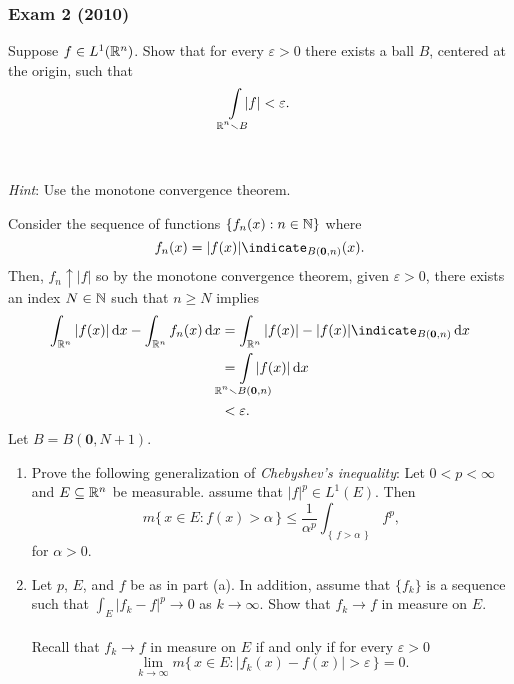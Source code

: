 \subsubsection{Exam 2 (2010)}
\setcounter{exercise}{0}
\setcounter{equation}{0}

\begin{problem}
  Suppose \(f\in L^1(\mathbb{R}^n)\). Show that for every \(\varepsilon>0\) there
  exists a ball \(B\), centered at the origin, such that
  \[
    \int\limsclap{\bbR^n\setminus B}|f|<\varepsilon.
  \]
  \\\\
  \emph{Hint}: Use the monotone convergence theorem.
\end{problem}
\begin{solution}
  Consider the sequence of functions \(\{f_n(x):n\in\mathbb{N}\}\) where
  \[
    f_n(x)=|f(x)|\indicate_{B(\mathbf{0},n)}(x).
  \]
  Then, \(f_n\uparrow |f|\) so by the monotone convergence theorem, given
  \(\varepsilon>0\), there exists an index \(N\in\mathbb{N}\) such that
  \(n\geq N\) implies
  \begin{align*}
    \int_{\bbR^n}|f(x)|\diff x-\int_{\bbR^n}f_n(x)\diff x
    &=\int_{\bbR^n}|f(x)|-|f(x)|\indicate_{B(\mathbf{0},n)}\diff x\\
    &=\int\limsclap{\bbR^n\setminus B(\mathbf{0},n)}|f(x)|\diff x\\
    &<\varepsilon.
  \end{align*}
  Let \(B=B(\mathbf{0},N+1)\).
\end{solution}
\begin{problem}
  \hfill
  \begin{enumerate}[label=(\alph*)]
  \item Prove the following generalization of \emph{Chebyshev's
      inequality}: Let \(0<p<\infty\) and \(E\subseteq\mathbb{R}^n\) be
    measurable. assume that \(|f|^p\in L^1(E)\). Then
    \[
      m\bigl\{\,x\in E:f(x)>\alpha\,\bigr\}
      \leq\frac{1}{\alpha^p}\int_{\left\{\,f>\alpha\,\right\}}f^p,
    \]
    for \(\alpha>0\).
  \item Let \(p\), \(E\), and \(f\) be as in part (a). In addition, assume
    that \(\{f_k\}\) is a sequence such that \(\int_E|f_k-f|^p\to 0\) as
    \(k\to\infty\). Show that \(f_k\to f\) in measure on \(E\).
    \\\\
    Recall that \(f_k\to f\) in measure on \(E\) if and only if for every
    \(\varepsilon>0\)
    \[
      \lim_{k\to\infty}m\bigl\{\,x\in
      E:|f_k(x)-f(x)|>\varepsilon\,\bigr\}=0.
    \]
\end{enumerate}
\end{problem}
\begin{solution}
\end{solution}

